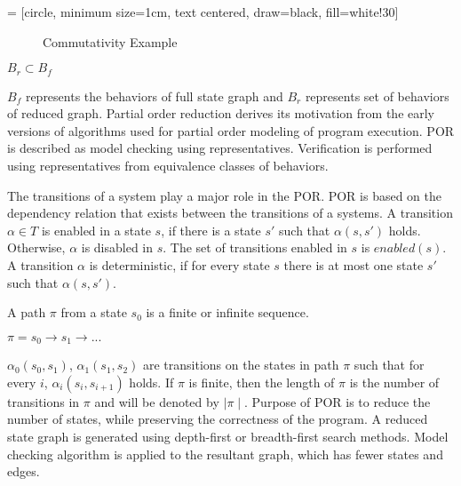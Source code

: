  = [circle, minimum size=1cm, text centered, draw=black, fill=white!30]

\begin{figure}[h]
\centering
{}
\caption{Commutativity Example}
\label{commutativity_example}
\end{figure}

$B_r \subset B_f$

$B_f$ represents the behaviors of full state graph and $B_r$ represents set of behaviors of reduced graph. 
Partial order reduction derives its motivation from the early versions of algorithms used for partial order modeling of program execution. 
POR is described as model checking using representatives\cite{por_repr}. 
Verification is performed using representatives from equivalence classes of behaviors. 

The transitions of a system play a major role in the POR. 
POR is based on the dependency relation that exists between the transitions of a systems. 
A transition $\alpha \in T$ is enabled in a state $s$, if there is a state $s'$ such that $\alpha(s, s')$ holds. 
Otherwise, $\alpha$ is disabled in $s$. 
The set of transitions enabled in $s$ is $enabled(s)$. 
A transition $\alpha$ is deterministic, if for every state $s$ there is at most one state $s'$ such that $\alpha(s, s')$. 

A path $\pi$ from a state $s_0$ is a finite or infinite sequence. 

$\pi = s_0 \rightarrow s_1 \rightarrow ...$

$\alpha_0(s_0, s_1)$, $\alpha_1(s_1, s_2)$ are transitions on the states in path $\pi$ such that for every $i$, $\alpha_i(s_i, s_{i+1})$ holds. 
If $\pi$ is finite, then the length of $\pi$ is the number of transitions in $\pi$ and will be denoted by $\mid \pi \mid$. 
Purpose of POR is to reduce the number of states, while preserving the correctness of the program. 
A reduced state graph is generated using depth-first or breadth-first search methods. 
Model checking algorithm is applied to the resultant graph, which has fewer states and edges. 

